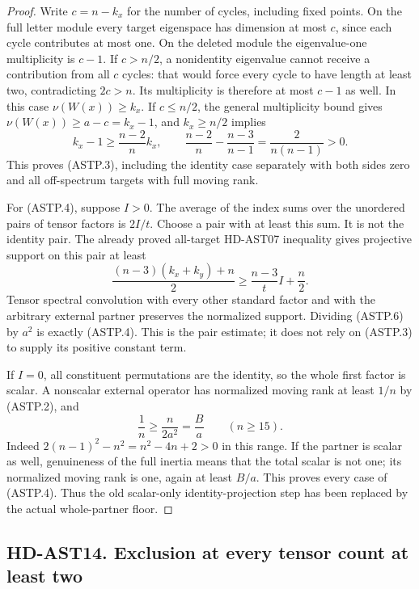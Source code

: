 \begin{proof}
Write $c=n-k_x$ for the number of cycles, including fixed points.
On the full letter module every target eigenspace has dimension at
most $c$, since each cycle contributes at most one.  On the deleted
module the eigenvalue-one multiplicity is $c-1$.
If $c>n/2$, a nonidentity eigenvalue cannot receive a contribution
from all $c$ cycles: that would force every cycle to have length at
least two, contradicting $2c>n$.  Its multiplicity is therefore
at most $c-1$ as well.  In this case $\nu(W(x))\ge k_x$.
If $c\le n/2$, the general multiplicity bound gives
$\nu(W(x))\ge a-c=k_x-1$, and $k_x\ge n/2$ implies
\[
 k_x-1\ge\frac{n-2}{n}k_x,
 \qquad
 \frac{n-2}{n}-\frac{n-3}{n-1}=\frac2{n(n-1)}>0.
 \tag{ASTP.5}
\]
This proves (ASTP.3), including the identity case separately with
both sides zero and all off-spectrum targets with full moving rank.

For (ASTP.4), suppose $I>0$.  The average of the index sums over
the unordered pairs of tensor factors is $2I/t$.  Choose a pair
with at least this sum.  It is not the identity pair.  The already
proved all-target HD-AST07 inequality gives projective support on
this pair at least
\[
 \frac{(n-3)(k_x+k_y)+n}{2}
       \ge\frac{n-3}{t}I+\frac n2.
 \tag{ASTP.6}
\]
Tensor spectral convolution with every other standard factor and
with the arbitrary external partner preserves the normalized
support.  Dividing (ASTP.6) by $a^2$ is exactly (ASTP.4).
This is the pair estimate; it does not rely on (ASTP.3) to supply
its positive constant term.

If $I=0$, all constituent permutations are the identity, so the
whole first factor is scalar.  A nonscalar external operator has
normalized moving rank at least $1/n$ by (ASTP.2), and
\[
              \frac1n\ge\frac{n}{2a^2}=\frac Ba
              \qquad(n\ge15).
 \tag{ASTP.7}
\]
Indeed $2(n-1)^2-n^2=n^2-4n+2>0$ in this range.
If the partner is scalar as well, genuineness of the full inertia
means that the total scalar is not one; its normalized moving
rank is one, again at least $B/a$.  This proves every case of
(ASTP.4).  Thus the old scalar-only identity-projection step has
been replaced by the actual whole-partner floor.
\end{proof}

\subsection*{HD-AST14. Exclusion at every tensor count at least two}

